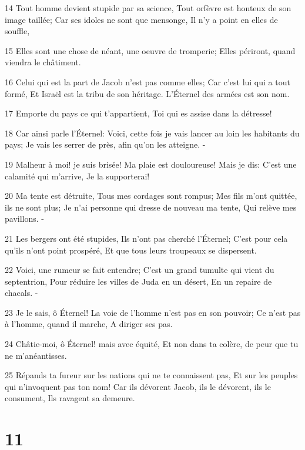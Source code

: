 \par 14 Tout homme devient stupide par sa science, Tout orfèvre est honteux de son image taillée; Car ses idoles ne sont que mensonge, Il n'y a point en elles de souffle,
\par 15 Elles sont une chose de néant, une oeuvre de tromperie; Elles périront, quand viendra le châtiment.
\par 16 Celui qui est la part de Jacob n'est pas comme elles; Car c'est lui qui a tout formé, Et Israël est la tribu de son héritage. L'Éternel des armées est son nom.
\par 17 Emporte du pays ce qui t'appartient, Toi qui es assise dans la détresse!
\par 18 Car ainsi parle l'Éternel: Voici, cette fois je vais lancer au loin les habitants du pays; Je vais les serrer de près, afin qu'on les atteigne. -
\par 19 Malheur à moi! je suis brisée! Ma plaie est douloureuse! Mais je dis: C'est une calamité qui m'arrive, Je la supporterai!
\par 20 Ma tente est détruite, Tous mes cordages sont rompus; Mes fils m'ont quittée, ils ne sont plus; Je n'ai personne qui dresse de nouveau ma tente, Qui relève mes pavillons. -
\par 21 Les bergers ont été stupides, Ils n'ont pas cherché l'Éternel; C'est pour cela qu'ils n'ont point prospéré, Et que tous leurs troupeaux se dispersent.
\par 22 Voici, une rumeur se fait entendre; C'est un grand tumulte qui vient du septentrion, Pour réduire les villes de Juda en un désert, En un repaire de chacals. -
\par 23 Je le sais, ô Éternel! La voie de l'homme n'est pas en son pouvoir; Ce n'est pas à l'homme, quand il marche, A diriger ses pas.
\par 24 Châtie-moi, ô Éternel! mais avec équité, Et non dans ta colère, de peur que tu ne m'anéantisses.
\par 25 Répands ta fureur sur les nations qui ne te connaissent pas, Et sur les peuples qui n'invoquent pas ton nom! Car ils dévorent Jacob, ils le dévorent, ils le consument, Ils ravagent sa demeure.

\chapter{11}

